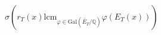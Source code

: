 \documentclass[preview]{standalone}
\begin{document}
\begin{center}
$\sigma(r_T(x) \text{lcm}_{\varphi \in \text{Gal}\left(\widetilde{E_T}/\mathbb{Q}\right)} \varphi(E_T(x)))$
\end{center}
\end{document}
